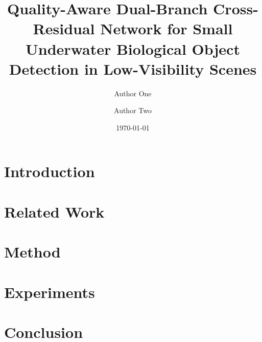 \documentclass[11pt]{article}
\title{Quality-Aware Dual-Branch Cross-Residual Network for Small Underwater Biological Object Detection in Low-Visibility Scenes}
\author{Author One \and Author Two}
\date{\today}
\begin{document}
\maketitle



\section{Introduction}


\section{Related Work}


\section{Method}


\section{Experiments}


\section{Conclusion}




\end{document}
